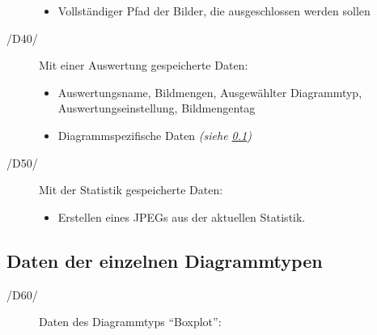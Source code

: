 \begin{description}
\begin{itemize}
		\item Vollständiger Pfad der Bilder, die ausgeschlossen werden sollen
	
	\end{itemize}
	
	\item[/D40/] Mit einer Auswertung gespeicherte Daten:
	
	\begin{itemize}
		
		\item Auswertungsname, Bildmengen, Ausgewählter Diagrammtyp, Auswertungseinstellung, Bildmengentag
		
		\item Diagrammspezifische Daten \itshape{(siehe \ref{subsec:daten-diagrammtypen})}
	
	\end{itemize}
		
	\item[/D50/] Mit der Statistik gespeicherte Daten:
	
	\begin{itemize}
	
		\item Erstellen eines JPEGs aus der aktuellen Statistik.
	
	\end{itemize}

\end{description}

\subsection{Daten der einzelnen Diagrammtypen}
\label{subsec:daten-diagrammtypen}

\begin{description}

	\item[/D60/] Daten des Diagrammtyps "`Boxplot"':

\end{description}